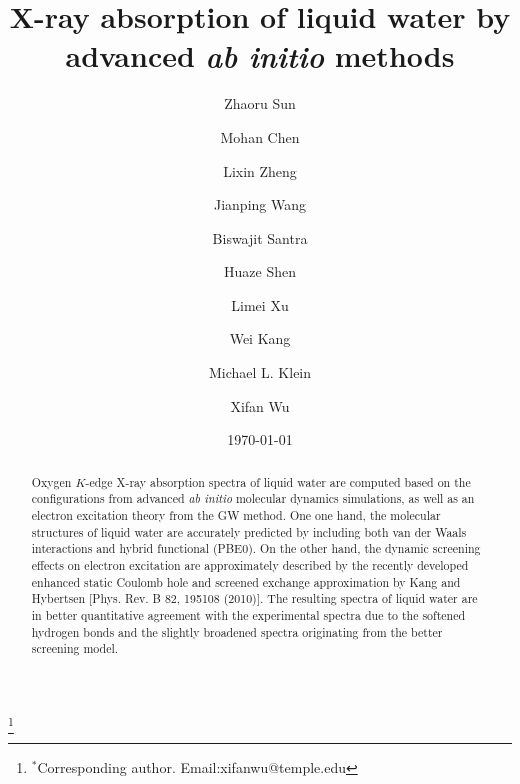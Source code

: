 \documentclass[prb,twocolumn,showpacs,preprintnumbers,superscriptaddress,amsmath,amssymb]{revtex4}
\begin{document}
\title{X-ray absorption of liquid water by advanced \emph{ab initio} methods}

\author{Zhaoru Sun}

\author{Mohan Chen}
\author{Lixin Zheng}
\author{Jianping Wang}
\author{Biswajit Santra}
\author{Huaze Shen}
\author{Limei Xu}
\author{Wei Kang}
\author{Michael L. Klein}
\author{Xifan Wu}
\thanks{$^\ast$Corresponding author. Email:xifanwu@temple.edu}

\date{\today}

\begin{abstract}
Oxygen $K$-edge X-ray absorption spectra of liquid water are computed
based on the configurations from advanced \emph{ab initio} molecular dynamics simulations,
as well as an electron excitation theory from the GW method.
One one hand, the molecular structures of liquid water are accurately predicted by including
both van der Waals interactions and hybrid functional (PBE0).
On the other hand, the dynamic screening effects on electron excitation are approximately described by the recently developed
enhanced static Coulomb hole and screened exchange approximation by Kang and Hybertsen [Phys. Rev. B 82, 195108 (2010)].
The resulting spectra of liquid water are in better quantitative agreement with the experimental spectra
due to the softened hydrogen bonds and the slightly broadened spectra originating from the better screening model.
\end{abstract}
\end{document}
